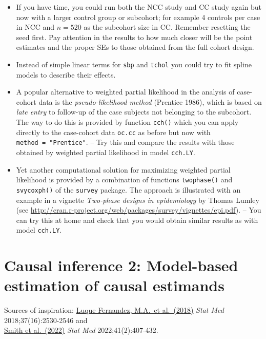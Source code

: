\documentclass[
]{book}
\begin{document}
\begin{itemize}
\item
  If you have time, you could run both the NCC study and CC study
  again but now with a larger control group or subcohort;
  for example 4 controls per case in NCC and \(n=520\) as the subcohort size in CC.
  Remember resetting the seed first.
  Pay attention in the results to how much closer
  will be the point estimates and the proper SEs to those
  obtained from the full cohort design.
\item
  Instead of simple linear terms for \texttt{sbp} and \texttt{tchol} you could try to fit
  spline models to describe their effects.
\item
  A popular alternative to weighted partial likelihood
  in the analysis of case-cohort data is the \emph{pseudo-likelihood method}
  (Prentice 1986), which is based on \emph{late entry} to follow-up
  of the case subjects not belonging to
  the subcohort.
  The way to do this is provided by function \texttt{cch()} which
  you can apply directly to the case-cohort data \texttt{oc.cc} as before
  but now with \texttt{method\ =\ "Prentice"}. -- Try this and compare the results
  with those obtained by weighted partial likelihood in model
  \texttt{cch.LY}.
\item
  Yet another computational solution for
  maximizing weighted partial likelihood is provided by
  a combination of functions \texttt{twophase()}
  and \texttt{svycoxph()} of the \texttt{survey} package.
  The approach is illustrated with an example
  in a vignette \emph{Two-phase designs in epidemiology} by Thomas Lumley
  (see \url{http://cran.r-project.org/web/packages/survey/vignettes/epi.pdf}).
  -- You can try this at home and check that you would obtain similar results as
  with model \texttt{cch.LY}.
\end{itemize}

\chapter{Causal inference 2: Model-based estimation of causal estimands}\label{causal-inference-2-model-based-estimation-of-causal-estimands}

Sources of inspiration: \href{https://doi.org/10.1002/sim.7628}{Luque Fernandez, M.A.~et al.~(2018)}
\emph{Stat Med} 2018;37(16):2530-2546 and\\
\href{https://doi.org/10.1002/sim.9234}{Smith et al.~(2022)} \emph{Stat Med} 2022;41(2):407-432.
\end{document}
